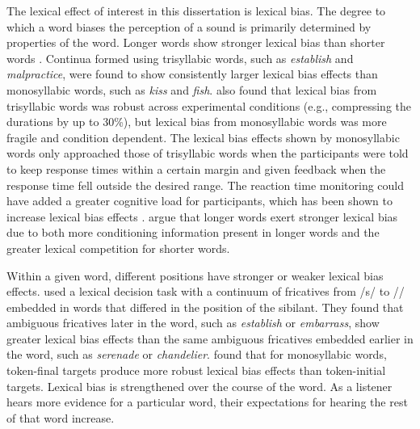 The lexical effect of interest in this dissertation is lexical bias.
The degree to which a word biases the perception of a sound is primarily determined by properties of the word.
Longer words show stronger lexical bias than shorter words \citep{Pitt2006}.  
Continua formed using trisyllabic words, such as \emph{establish} and \emph{malpractice}, were found to show consistently larger lexical bias effects than monosyllabic words, such as \emph{kiss} and \emph{fish}.  
\citet{Pitt2006} also found that lexical bias from trisyllabic words was robust across experimental conditions (e.g., compressing the durations by up to 30\%), but lexical bias from monosyllabic words was more fragile and condition dependent.
The lexical bias effects shown by monosyllabic words only approached those of trisyllabic words when the participants were told to keep response times within a certain margin and given feedback when the response time fell outside the desired range.
The reaction time monitoring could have added a greater cognitive load for participants, which has been shown to increase lexical bias effects \citep{Mattys2011}.
\citet{Pitt2006} argue that longer words exert stronger lexical bias due to both more conditioning information present in longer words and the greater lexical competition for shorter words.

Within a given word, different positions have stronger or weaker lexical bias effects.
\citet{Pitt2012} used a lexical decision task with a continuum of fricatives from /s/ to /\textesh/ embedded in words that differed in the position of the sibilant.  
They found that ambiguous fricatives later in the word, such as \emph{establish} or \emph{embarrass}, show greater lexical bias effects than the same ambiguous fricatives embedded earlier in the word, such as \emph{serenade} or \emph{chandelier}.
\citet{Pitt1993} found that for monosyllabic words, token-final targets produce more robust lexical bias effects than token-initial targets.
Lexical bias is strengthened over the course of the word.
As a listener hears more evidence for a particular word, their expectations for hearing the rest of that word increase.

